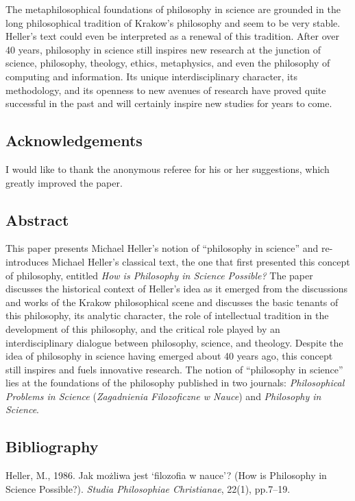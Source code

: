 \documentclass[a4paper]{article}
\begin{document}
The metaphilosophical foundations of philosophy in science are grounded in the long philosophical tradition of Krakow’s
philosophy and seem to be very stable. Heller’s text could even be interpreted as a renewal of this tradition. After
over 40 years, philosophy in science still inspires new research at the junction of science, philosophy, theology,
ethics, metaphysics, and even the philosophy of computing and information. Its unique interdisciplinary character, its
methodology, and its openness to new avenues of research have proved quite successful in the past and will certainly
inspire new studies for years to come.

\subsection{Acknowledgements}
I would like to thank the anonymous referee for his or her suggestions, which greatly improved the paper.

\subsection{Abstract}
This paper presents Michael Heller’s notion of “philosophy in science” and re-introduces Michael Heller’s classical
text, the one that first presented this concept of philosophy, entitled \textit{How is Philosophy in Scien}\textit{ce
Possible?} The paper discusses the historical context of Heller’s idea as it emerged from the discussions and works of
the Krakow philosophical scene and discusses the basic tenants of this philosophy, its analytic character, the role of
intellectual tradition in the development of this philosophy, and the critical role played by an interdisciplinary
dialogue between philosophy, science, and theology. Despite the idea of philosophy in science having emerged about 40
years ago, this concept still inspires and fuels innovative research. The notion of “philosophy in science” lies at the
foundations of the philosophy published in two journals:\textit{ Philosophical Problems in Science}
(\textit{Zagadnienia Filozoficzne w Nauce}) and \textit{Philosophy in Science}.

\subsection[Bibliography]{Bibliography}
Heller, M., 1986. Jak możliwa jest ‘filozofia w nauce’? (How is Philosophy in Science Possible?). \textit{Studia
Philosophiae Christianae}, 22(1), pp.7–19.
\end{document}
